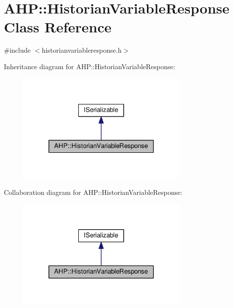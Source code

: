 \hypertarget{class_a_h_p_1_1_historian_variable_response}{}\section{A\+H\+P\+:\+:Historian\+Variable\+Response Class Reference}
\label{class_a_h_p_1_1_historian_variable_response}


{\ttfamily \#include $<$historianvariableresponse.\+h$>$}



Inheritance diagram for A\+H\+P\+:\+:Historian\+Variable\+Response\+:
\nopagebreak
\begin{figure}[H]
\begin{center}
\leavevmode
\includegraphics[width=242pt]{class_a_h_p_1_1_historian_variable_response__inherit__graph}
\end{center}
\end{figure}


Collaboration diagram for A\+H\+P\+:\+:Historian\+Variable\+Response\+:
\nopagebreak
\begin{figure}[H]
\begin{center}
\leavevmode
\includegraphics[width=242pt]{class_a_h_p_1_1_historian_variable_response__coll__graph}
\end{center}
\end{figure}
